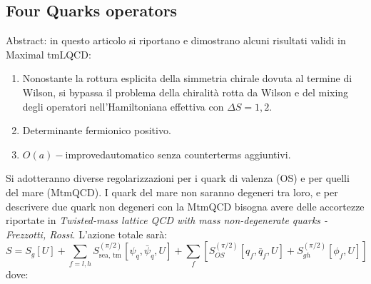 \documentclass[12pt,a4paper,openright]{article}
\newcommand{\colg}{\textcolor{PineGreen}}
\newcommand{\oai}{$O(a)-$improved}
\begin{document}
\subsection*{Four Quarks operators}
Abstract: in questo articolo si riportano e dimostrano alcuni risultati validi in Maximal tmLQCD:
\begin{enumerate}
  \item Nonostante la rottura esplicita della simmetria chirale dovuta al termine di Wilson, si bypassa il problema della chiralità rotta da Wilson e del mixing degli operatori nell'Hamiltoniana effettiva con $\Delta S = 1,2$.
  \item Determinante fermionico positivo.
  \item \oai automatico senza counterterms aggiuntivi.
\end{enumerate}
Si adotteranno \colg{diverse regolarizzazioni per i quark di valenza (OS) e per quelli del mare (MtmQCD)}.
I quark del mare non saranno degeneri tra loro, e per descrivere due quark non degeneri con la MtmQCD bisogna avere delle accortezze riportate in \textit{Twisted-mass lattice QCD with mass non-degenerate quarks - Frezzotti, Rossi}.
\newline
L'azione totale sarà:
\begin{equation}\label{eq:setup-action}
  S = S_g[U] + \sum_{f = l, h} S_{\text{sea, tm}}^{(\pi/2)}[\psi_q, \bar\psi_q,U] + \sum_f \left[ S_{OS}^{(\pi/2)} [q_f, \bar q_f, U] + S_{gh}^{(\pi/2)} [\phi_f, U] \right]
\end{equation}
dove:
\end{document}

